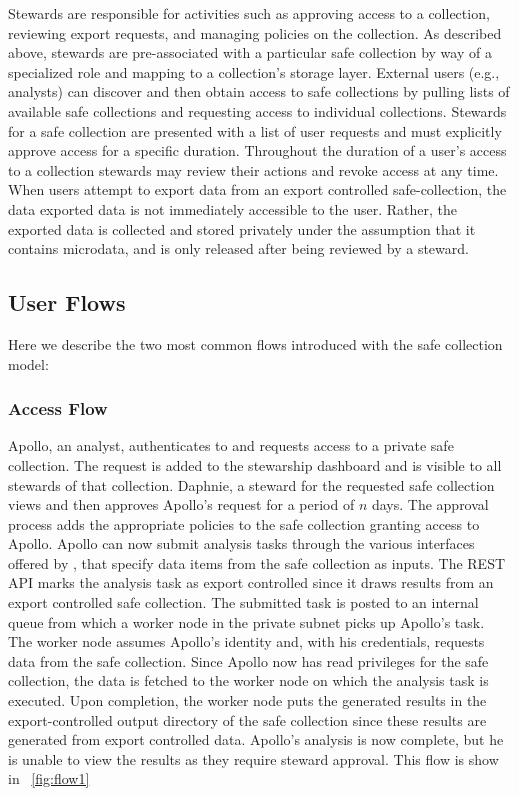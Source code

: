 Stewards are responsible for activities such as approving access to a collection, reviewing
export requests, and managing policies on the collection.
As described above, stewards are pre-associated with a particular safe collection by
way of a specialized role and mapping to a collection's storage layer.
External users (e.g., analysts) can discover
and then obtain access to safe collections by pulling lists of available safe collections and requesting
access to individual collections.
Stewards for a safe collection are presented with a list of user requests and must explicitly approve access
for a specific duration. Throughout the duration of a user's access to a collection
stewards may review their actions and revoke access at any time. When users attempt
to export data from an export controlled safe-collection, the data exported data is not immediately
accessible to the user. Rather, the exported data is collected and stored privately under the assumption that it contains microdata, and is only released after being reviewed by a steward.


\subsection{User Flows}

Here we describe the two most common flows introduced with the safe collection model:

\subsubsection{Access Flow}

Apollo, an analyst, authenticates to \NAME and requests access to a private safe collection.
The request is added to the stewarship dashboard and is visible to all stewards
of that collection. Daphnie, a steward for the requested
safe collection views and then approves Apollo's request for a period of $n$ days.
The approval process adds the appropriate policies to the
safe collection granting access to Apollo. Apollo can now submit analysis tasks through the various
interfaces offered by \NAMENS, that specify data items from the safe collection as inputs.
The REST API marks the analysis task as export controlled since it draws results
from an export controlled safe collection.
The submitted task is posted to an internal queue from which a
worker node in the \NAME private subnet picks up Apollo's task. The worker node assumes Apollo's identity and, with
his credentials, requests data from the safe collection. Since Apollo now has read privileges for the
safe collection, the data is fetched to the worker node on which the analysis task is executed.
Upon completion, the worker node puts the generated results in the export-controlled
output directory of the safe collection since these results are generated from export controlled data.
Apollo's analysis is now complete, but he is unable to view the
results as they require steward approval. This flow is show in \figurename~\ref{fig:flow1}

